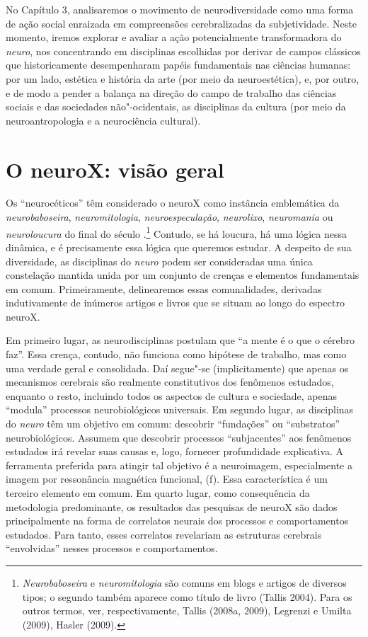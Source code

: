 No Capítulo 3, analisaremos o movimento de neurodiversidade como uma
forma de ação social enraizada em compreensões cerebralizadas da
subjetividade. Neste momento, iremos explorar e avaliar a ação
potencialmente transformadora do \emph{neuro}, nos concentrando em
disciplinas escolhidas por derivar de campos clássicos que
historicamente desempenharam papéis fundamentais nas ciências humanas:
por um lado, estética e história da arte (por meio da neuroestética), e,
por outro, e de modo a pender a balança na direção do campo de trabalho
das ciências sociais e das sociedades não"-ocidentais, as disciplinas da
cultura (por meio da neuroantropologia e a neurociência cultural).

\section{O neuroX: visão geral}

Os ``neurocéticos'' têm considerado o neuroX como instância emblemática
da \emph{neurobaboseira}, \emph{neuromitologia},
\emph{neuroespeculação}, \emph{neurolixo}, \emph{neuromania} ou
\emph{neuroloucura} do final do século .\footnote[2]{\emph{Neurobaboseira} e \emph{neuromitologia} são comuns em blogs e
artigos de diversos tipos; o segundo também aparece como título de livro
(Tallis 2004). Para os outros termos, ver, respectivamente, Tallis
(2008a, 2009), Legrenzi e Umilta (2009), Hasler (2009).} Contudo,
se há loucura, há uma lógica nessa dinâmica, e é precisamente essa
lógica que queremos estudar. A despeito de sua diversidade, as
disciplinas do \emph{neuro} podem ser consideradas uma única constelação
mantida unida por um conjunto de crenças e elementos fundamentais em
comum. Primeiramente, delinearemos essas comunalidades, derivadas
indutivamente de inúmeros artigos e livros que se situam ao longo do espectro
neuroX.

Em primeiro lugar, as neurodisciplinas postulam que ``a mente é o que o
cérebro faz''. Essa crença, contudo, não funciona como hipótese de
trabalho, mas como uma verdade geral e consolidada. Daí segue"-se
(implicitamente) que apenas os mecanismos cerebrais são realmente
constitutivos dos fenômenos estudados, enquanto o resto, incluindo
todos os aspectos de cultura e sociedade, apenas ``modula'' processos
neurobiológicos universais. Em segundo lugar, as disciplinas do
\emph{neuro} têm um objetivo em comum: descobrir ``fundações''
ou ``substratos'' neurobiológicos. Assumem que descobrir processos
``subjacentes'' aos fenômenos estudados irá revelar suas causas e, logo,
fornecer profundidade explicativa. A ferramenta preferida para atingir
tal objetivo é a neuroimagem, especialmente a imagem por ressonância
magnética funcional, (f). Essa característica é um terceiro elemento
em comum. Em quarto lugar, como consequência da metodologia
predominante, os resultados das pesquisas de neuroX são dados
principalmente na forma de correlatos neurais dos processos e
comportamentos estudados. Para tanto, esses correlatos revelariam as
estruturas cerebrais ``envolvidas'' nesses processos e comportamentos.

